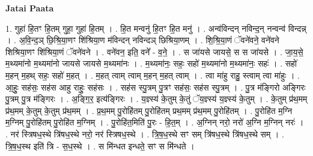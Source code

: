 \documentclass[17pt]{extarticle}
\begin{document}
\textbf{Jatai Paata} \newline

1. गुहा॑ हि॒तꣳ हि॒तम् गुहा॒ गुहा॑ हि॒तम् । . हि॒त मन्वनु॑ हि॒तꣳ हि॒त मनु॑ । . अन्व॑विन्दन् नविन्द॒न् नन्वन्व॑ विन्दन्न् । . अ॒वि॒न्द॒ञ् छि॒श्रि॒या॒णꣳ शि॑श्रिया॒ण म॑विन्दन् नविन्दञ् छिश्रिया॒णम् । . शि॒श्रि॒या॒णं ॅवने॑वने॒ वने॑वने शिश्रिया॒णꣳ शि॑श्रिया॒णं ॅवने॑वने । . वने॑वन॒ इति॒ वने᳚ - व॒ने॒ । . स जा॑यसे जायसे॒ स स जा॑यसे । . जा॒य॒से॒ म॒थ्यमा॑नो म॒थ्यमा॑नो जायसे जायसे म॒थ्यमा॑नः । . म॒थ्यमा॑नः॒ सहः॒ सहो॑ म॒थ्यमा॑नो म॒थ्यमा॑नः॒ सहः॑ । . सहो॑ म॒हन् म॒हथ् सहः॒ सहो॑ म॒हत् । . म॒हत् त्वाम् त्वाम् म॒हन् म॒हत् त्वाम् । . त्वा मा॑हु राहु॒ स्त्वाम् त्वा मा॑हुः । . आ॒हुः॒ सह॑सः॒ सह॑स आहु राहुः॒ सह॑सः । . सह॑स स्पु॒त्रम् पु॒त्रꣳ सह॑सः॒ सह॑स स्पु॒त्रम् । . पु॒त्र म॑ङ्गिरो अङ्गिरः पु॒त्रम् पु॒त्र म॑ङ्गिरः । . अ॒ङ्गि॒र॒ इत्य॑ङ्गिरः । . य॒ज्ञ्स्य॑ के॒तुम् के॒तुं ॅय॒ज्ञ्स्य॑ य॒ज्ञ्स्य॑ के॒तुम् । . के॒तुम् प्र॑थ॒मम् प्र॑थ॒मम् के॒तुम् के॒तुम् प्र॑थ॒मम् । . प्र॒थ॒मम् पु॒रोहि॑तम् पु॒रोहि॑तम् प्रथ॒मम् प्र॑थ॒मम् पु॒रोहि॑तम् । . पु॒रोहि॑त म॒ग्नि म॒ग्निम् पु॒रोहि॑तम् पु॒रोहि॑त म॒ग्निम् । . पु॒रोहि॑त॒मिति॑ पु॒रः - हि॒त॒म् । . अ॒ग्निन् नरो॒ नरो॑ अ॒ग्नि म॒ग्निन् नरः॑ । . नर॑ स्त्रिषध॒स्थे त्रि॑षध॒स्थे नरो॒ नर॑ स्त्रिषध॒स्थे । . त्रि॒ष॒ध॒स्थे सꣳ सम् त्रि॑षध॒स्थे त्रि॑षध॒स्थे सम् । . त्रि॒ष॒ध॒स्थ इति॑ त्रि - स॒ध॒स्थे । . स मि॑न्धत इन्धते॒ सꣳ स मि॑न्धते । \newline
\end{document}
